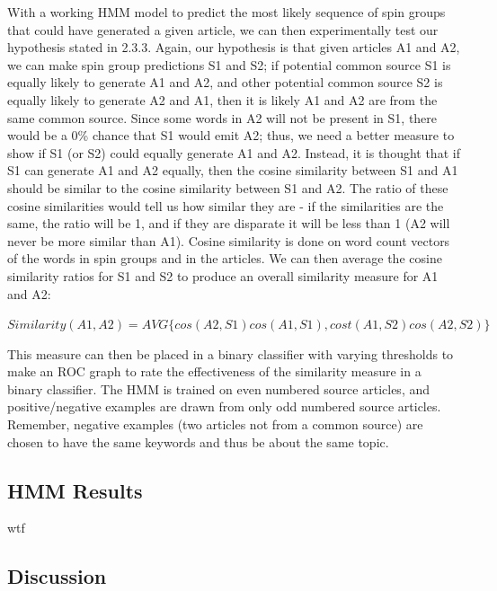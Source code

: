 \documentclass[11pt,letterpaper,oneside, titlepage]{scrartcl}
\begin{document}
With a working HMM model to predict the most likely sequence of spin groups that could have generated a given article, we can then experimentally test our hypothesis stated in 2.3.3. Again, our hypothesis is that given articles A1 and A2, we can make spin group predictions S1 and S2; if potential common source S1 is equally likely to generate A1 and A2, and other potential common source S2 is equally likely to generate A2 and A1, then it is likely A1 and A2 are from the same common source. Since some words in A2 will not be present in S1, there would be a 0\% chance that S1 would emit A2; thus, we need a better measure to show if S1 (or S2) could equally generate A1 and A2. Instead, it is thought that if S1 can generate A1 and A2 equally, then the cosine similarity between S1 and A1 should be similar to the cosine similarity between S1 and A2. The ratio of these cosine similarities would tell us how similar they are - if the similarities are the same, the ratio will be 1, and if they are disparate it will be less than 1 (A2 will never be more similar than A1). Cosine similarity is done on word count vectors of the words in spin groups and in the articles. We can then average the cosine similarity ratios for S1 and S2 to produce an overall similarity measure for A1 and A2:

$Similarity(A1, A2) = AVG\{ cos(A2, S1)cos(A1, S1) , cost(A1, S2)cos(A2, S2) \}$

This measure can then be placed in a binary classifier with varying thresholds to make an ROC graph to rate the effectiveness of the similarity measure in a binary classifier. The HMM is trained on even numbered source articles, and positive/negative examples are drawn from only odd numbered source articles. Remember, negative examples (two articles not from a common source) are chosen to have the same keywords and thus be about the same topic.

\subsection{HMM Results}

wtf


\subsection{Discussion}
\end{document}
